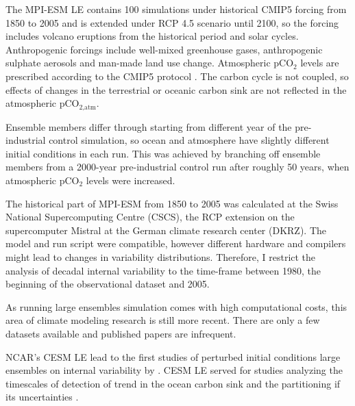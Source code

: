  

The \acs{MPI-ESM LE} contains 100 simulations under historical \acs{CMIP5} forcing from 1850 to 2005 and is extended under \ac{RCP} 4.5 scenario until 2100, so the forcing includes volcano eruptions from the historical period and solar cycles. Anthropogenic forcings include well-mixed greenhouse gases, anthropogenic sulphate aerosols and man-made land use change. Atmospheric pCO$_2$ levels are prescribed according to the \acs{CMIP5} protocol \citep{Taylor2012}. The carbon cycle is not coupled, so effects of changes in the terrestrial or oceanic carbon sink are not reflected in the atmospheric pCO$_{\text{2,atm}}$. 

Ensemble members differ through starting from different year of the pre-industrial control simulation, so ocean and atmosphere have slightly different initial conditions in each run. This was achieved by branching off ensemble members from a 2000-year pre-industrial control run after roughly 50 years, when atmospheric pCO$_2$ levels were increased. 

The historical part of \acs{MPI-ESM} from 1850 to 2005 was calculated at the Swiss National Supercomputing Centre (CSCS), the \acs{RCP} extension on the supercomputer Mistral at the German climate research center (DKRZ). The model and run script were compatible, however different hardware and compilers might lead to changes in variability distributions. Therefore, I restrict the analysis of decadal internal variability to the time-frame between 1980, the beginning of the observational dataset and 2005.\newline
 



As running large ensembles simulation comes with high computational costs, this area of climate modeling research is still more recent. There are only a few datasets available and published papers are infrequent.

\acs{NCAR}'s \ac{CESM} \acs{LE} \citep{Kay2015} lead to the first studies of perturbed initial conditions large ensembles on internal variability by \cite{Deser2012}. \acs{CESM} \acs{LE} served for studies analyzing the timescales of detection of trend in the ocean carbon sink \citep{McKinley2016} and the partitioning if its uncertainties \citep{Lovenduski2016}. 

